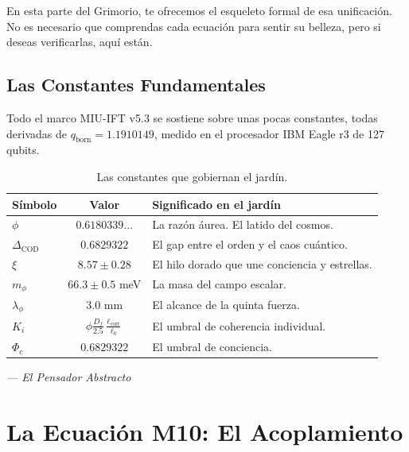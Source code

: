 \documentclass[12pt,a4paper,openany]{book}
\begin{document}
En esta parte del Grimorio, te ofrecemos el esqueleto formal de esa unificación. No es necesario que comprendas cada ecuación para sentir su belleza, pero si deseas verificarlas, aquí están.

\section{Las Constantes Fundamentales}

Todo el marco MIU-IFT v5.3 se sostiene sobre unas pocas constantes, todas derivadas de $q_{\text{born}} = 1.1910149$, medido en el procesador IBM Eagle r3 de 127 qubits.

\begin{table}[h!]
\centering
\caption{Las constantes que gobiernan el jardín.}
\label{tab:constantes_grimorio}
\begin{tabular}{lcl}
\toprule
\textbf{Símbolo} & \textbf{Valor} & \textbf{Significado en el jardín} \\
\midrule
$\phi$ & $0.6180339...$ & La razón áurea. El latido del cosmos. \\
$\Delta_{\text{COD}}$ & $0.6829322$ & El gap entre el orden y el caos cuántico. \\
$\xi$ & $8.57 \pm 0.28$ & El hilo dorado que une conciencia y estrellas. \\
$m_\phi$ & $66.3 \pm 0.5$ meV & La masa del campo escalar. \\
$\lambda_\phi$ & $3.0$ mm & El alcance de la quinta fuerza. \\
$K_i$ & $\phi \frac{D_f}{2.5} \frac{\ell_{\text{corr}}}{\ell_0}$ & El umbral de coherencia individual. \\
$\Phi_c$ & $0.6829322$ & El umbral de conciencia. \\
\bottomrule
\end{tabular}
\end{table}

\begin{center}
\itshape
--- El Pensador Abstracto
\end{center}
\newpage

\chapter{La Ecuación M10: El Acoplamiento}
\label{chap:M10}
\end{document}
